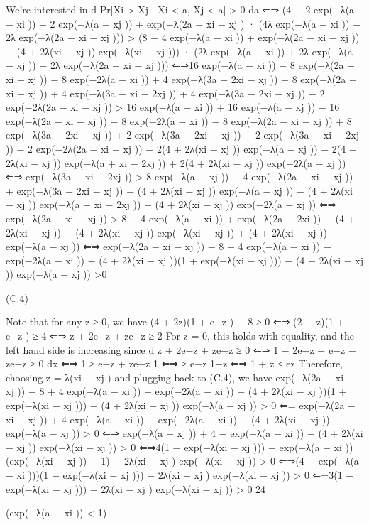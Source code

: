\documentclass[10pt]{article}
\begin{document}
\begin{ReviewVerbatim}
We’re interested in
d
Pr[Xi > Xj | Xi < a, Xj < a] > 0
da
⇐⇒ (4 − 2 exp(−λ(a − xi )) − 2 exp(−λ(a − xj )) + exp(−λ(2a − xi − xj )
· (4λ exp(−λ(a − xi )) − 2λ exp(−λ(2a − xi − xj )))
> (8 − 4 exp(−λ(a − xi )) + exp(−λ(2a − xi − xj )) − (4 + 2λ(xi − xj )) exp(−λ(xi − xj )))
· (2λ exp(−λ(a − xi )) + 2λ exp(−λ(a − xj )) − 2λ exp(−λ(2a − xi − xj )))
⇐⇒16 exp(−λ(a − xi )) − 8 exp(−λ(2a − xi − xj )) − 8 exp(−2λ(a − xi )) + 4 exp(−λ(3a − 2xi − xj ))
− 8 exp(−λ(2a − xi − xj )) + 4 exp(−λ(3a − xi − 2xj )) + 4 exp(−λ(3a − 2xi − xj ))
− 2 exp(−2λ(2a − xi − xj ))
> 16 exp(−λ(a − xi )) + 16 exp(−λ(a − xj )) − 16 exp(−λ(2a − xi − xj ))
− 8 exp(−2λ(a − xi )) − 8 exp(−λ(2a − xi − xj )) + 8 exp(−λ(3a − 2xi − xj ))
+ 2 exp(−λ(3a − 2xi − xj )) + 2 exp(−λ(3a − xi − 2xj )) − 2 exp(−2λ(2a − xi − xj ))
− 2(4 + 2λ(xi − xj )) exp(−λ(a − xj )) − 2(4 + 2λ(xi − xj )) exp(−λ(a + xi − 2xj ))
+ 2(4 + 2λ(xi − xj )) exp(−2λ(a − xj ))
⇐⇒ exp(−λ(3a − xi − 2xj ))
> 8 exp(−λ(a − xj )) − 4 exp(−λ(2a − xi − xj )) + exp(−λ(3a − 2xi − xj ))
− (4 + 2λ(xi − xj )) exp(−λ(a − xj )) − (4 + 2λ(xi − xj )) exp(−λ(a + xi − 2xj ))
+ (4 + 2λ(xi − xj )) exp(−2λ(a − xj ))
⇐⇒ exp(−λ(2a − xi − xj ))
> 8 − 4 exp(−λ(a − xi )) + exp(−λ(2a − 2xi ))
− (4 + 2λ(xi − xj )) − (4 + 2λ(xi − xj )) exp(−λ(xi − xj )) + (4 + 2λ(xi − xj )) exp(−λ(a − xj ))
⇐⇒ exp(−λ(2a − xi − xj )) − 8 + 4 exp(−λ(a − xi )) − exp(−2λ(a − xi ))
+ (4 + 2λ(xi − xj ))(1 + exp(−λ(xi − xj ))) − (4 + 2λ(xi − xj )) exp(−λ(a − xj ))
>0

(C.4)

Note that for any z ≥ 0, we have
(4 + 2z)(1 + e−z ) − 8 ≥ 0 ⇐⇒ (2 + z)(1 + e−z ) ≥ 4
⇐⇒ z + 2e−z + ze−z ≥ 2
For z = 0, this holds with equality, and the left hand side is increasing since
d
z + 2e−z + ze−z ≥ 0 ⇐⇒ 1 − 2e−z + e−z − ze−z ≥ 0
dx
⇐⇒ 1 ≥ e−z + ze−z
1
⇐⇒
≥ e−z
1+z
⇐⇒ 1 + z ≤ ez
Therefore, choosing z = λ(xi − xj ) and plugging back to (C.4), we have
exp(−λ(2a − xi − xj )) − 8 + 4 exp(−λ(a − xi )) − exp(−2λ(a − xi ))
+ (4 + 2λ(xi − xj ))(1 + exp(−λ(xi − xj ))) − (4 + 2λ(xi − xj )) exp(−λ(a − xj )) > 0
⇐= exp(−λ(2a − xi − xj )) + 4 exp(−λ(a − xi )) − exp(−2λ(a − xi )) − (4 + 2λ(xi − xj )) exp(−λ(a − xj )) > 0
⇐⇒ exp(−λ(a − xj )) + 4 − exp(−λ(a − xi )) − (4 + 2λ(xi − xj )) exp(−λ(xi − xj )) > 0
⇐⇒4(1 − exp(−λ(xi − xj ))) + exp(−λ(a − xi ))(exp(−λ(xi − xj )) − 1) − 2λ(xi − xj ) exp(−λ(xi − xj )) > 0
⇐⇒(4 − exp(−λ(a − xi )))(1 − exp(−λ(xi − xj ))) − 2λ(xi − xj ) exp(−λ(xi − xj )) > 0
⇐=3(1 − exp(−λ(xi − xj ))) − 2λ(xi − xj ) exp(−λ(xi − xj )) > 0
24

(exp(−λ(a − xi )) < 1)



\end{ReviewVerbatim}
\end{document}
